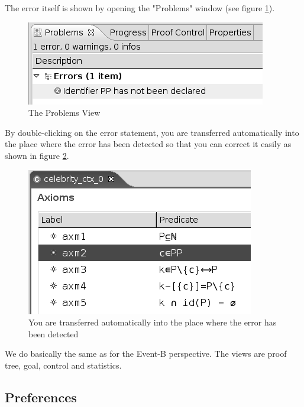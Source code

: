 The error itself is shown by opening the "Problems" window (see figure \ref{fig_ref_01_problemsview2}). 

\begin{figure}[!h]
\begin{center}
	\includegraphics{img/reference/ref_01_problemsview2.png}
	\caption{The Problems View}
	\label{fig_ref_01_problemsview2}
\end{center}
\end{figure}

By double-clicking on the error statement, you are transferred automatically into the place where the error has been detected so that you can correct it easily as shown in figure \ref{fig_ref_01_problemsview3}. 

\begin{figure}[!h]
\begin{center}
	\includegraphics{img/reference/ref_01_problemsview3.png}
	\caption{You are transferred automatically into the place where the error has been detected}
	\label{fig_ref_01_problemsview3}
\end{center}
\end{figure}


We do basically the same as for the Event-B perspective. The views are proof tree, goal, control and statistics.
 
\subsection{Preferences}

